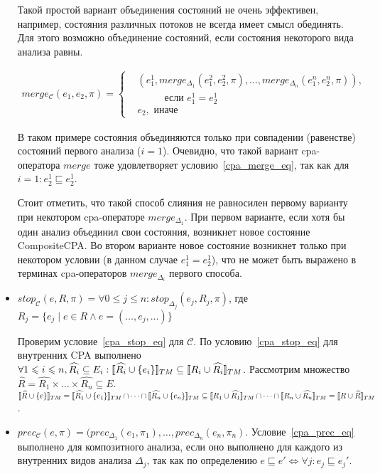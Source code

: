 \begin{itemize}
Такой простой вариант объединения состояний не очень эффективен, например, состояния различных потоков не всегда имеет смысл обединять.
Для этого возможно объединение состояний, если состояния некоторого вида анализа равны. 

\begin{align*}
merge_{\mathscr{C}}(e_1,e_2,\pi) =
\begin{cases}
&(e_1^1, merge_{\Delta_1}(e_1^2, e_2^2,\pi), \dots, merge_{\Delta_n}(e_1^n, e_2^n,\pi)), \\
& \hspace{1cm} \mbox{ если } e_1^1 = e_2^1 \\
& e_2, \mbox{ иначе }
\end{cases} 
\end{align*}

В таком примере состояния объединяются только при совпадении (равенстве) состояний первого анализа ($i=1$).
Очевидно, что такой вариант cpa-оператора $merge$ тоже удовлетворяет условию~\ref{cpa_merge_eq}, так как для $i = 1: e_2^1 \sqsubseteq e_2^1$.

Стоит отметить, что такой способ слияния не равносилен первому варианту при некотором cpa-операторе $merge_{\Delta_1}$.
При первом варианте, если хотя бы один анализ объединил свои состояния, возникнет новое состояние CompositeCPA. 
Во втором варианте новое состояние возникнет только при некотором условии (в данном случае $e_1^1 = e_2^1$), что не может быть выражено в терминах cpa-операторов $merge_{\Delta_i}$ первого способа.

\item 
$stop_{\mathscr{C}}(e,R,\pi)=\forall 0 \le j \le n: stop_{\Delta_j}(e_j, R_j, \pi)$, где $R_j = \{e_j \mid e \in R \land e = (\dots, e_j, \dots)\}$

Проверим условие~\ref{cpa_stop_eq} для $\mathscr{C}$.
По условию~\ref{cpa_stop_eq} для внутренних CPA выполнено $\forall 1 \leqslant i \leqslant n, \widehat{R_i} \subseteq E_i: [\![ \widehat{R_i} \cup \{e_i\} ]\!]_{TM} \subseteq [\![ R_i \cup \widehat{R_i} ]\!]_{TM}$.
Рассмотрим множество $\widehat{R} = \widehat{R_1} \times \dots \times \widehat{R_n} \subseteq E$. 
$\conc{\widehat{R} \cup \{e\}}_{TM} = \conc{\widehat{R_1} \cup \{e_1\}}_{TM} \cap \dots \cap \conc{\widehat{R_n} \cup \{e_n\}}_{TM} \subseteq \conc{R_1 \cup \widehat{R_1}}_{TM} \cap \dots \cap \conc{R_n \cup \widehat{R_n}}_{TM} = \conc{R \cup \widehat{R}}_{TM}$.

\item 
$prec_{\mathscr{C}}(e,\pi)=(prec_{\Delta_1}(e_1, \pi_1), \dots, prec_{\Delta_n}(e_n, \pi_n)$. Условие~\ref{cpa_prec_eq} выполнено для композитного анализа, если оно выполнено для каждого из внутренних видов анализа $\Delta_j$, так как по определению $e \sqsubseteq e' \iff \forall j: e_j \sqsubseteq e_j'$.


\end{itemize}
